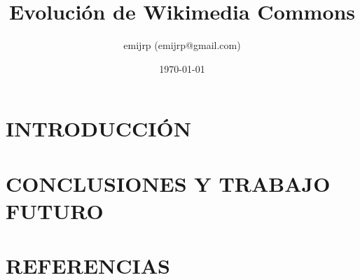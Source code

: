 \documentclass[11pt,twocolumn]{article}
\title{Evolución de Wikimedia Commons}
\author{emijrp (emijrp@gmail.com)}
\date{\today}
\begin{document}
\maketitle

\section{\uppercase{Introducción}}

\section{\uppercase{Conclusiones y trabajo futuro}}

\section{\uppercase{Referencias}}
\end{document}
